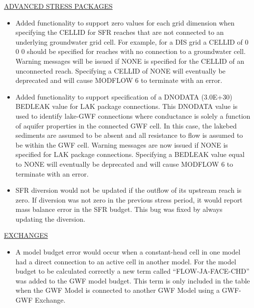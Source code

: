 	\underline{ADVANCED STRESS PACKAGES}
	\begin{itemize}
		\item Added functionality to support zero values for each grid dimension when specifying the CELLID for SFR reaches that are not connected to an underlying groundwater grid cell. For example, for a DIS grid a CELLID of 0 0 0 should be specified for reaches with no connection to a groundwater cell. Warning messages will be issued if NONE is specified for the CELLID of an unconnected reach. Specifying a CELLID of NONE will eventually be deprecated and will cause MODFLOW 6 to terminate with an error.
		\item Added functionality to support specification of a DNODATA (3.0E+30) BEDLEAK value for LAK package connections.  This DNODATA value is used to identify lake-GWF connections where conductance is solely a function of aquifer properties in the connected GWF cell.  In this case, the lakebed sediments are assumed to be absent and all resistance to flow is assumed to be within the GWF cell. Warning messages are now issued if NONE is specified for LAK package connections. Specifying a BEDLEAK value equal to NONE will eventually be deprecated and will cause MODFLOW 6 to terminate with an error.
		\item SFR diversion would not be updated if the outflow of its upstream reach is zero. If diversion was not zero in the previous stress period, it would report mass balance error in the SFR budget. This bug was fixed by always updating the diversion.
	\end{itemize}


	\underline{EXCHANGES}
	\begin{itemize}
		\item A model budget error would occur when a constant-head cell in one model had a direct connection to an active cell in another model.  For the model budget to be calculated correctly a new term called ``FLOW-JA-FACE-CHD'' was added to the GWF model budget.  This term is only included in the table when the GWF Model is connected to another GWF Model using a GWF-GWF Exchange.  
	\end{itemize}
